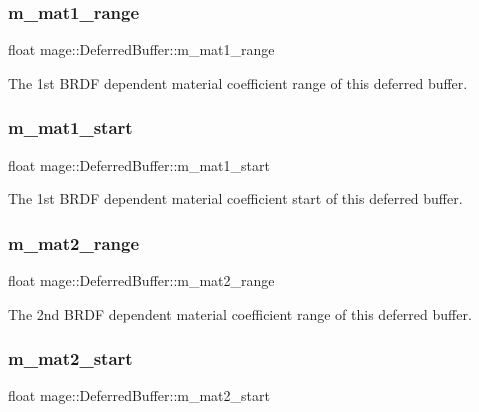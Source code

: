 \subsubsection{\texorpdfstring{m\+\_\+mat1\+\_\+range}{m\_mat1\_range}}
{\footnotesize\ttfamily float mage\+::\+Deferred\+Buffer\+::m\+\_\+mat1\+\_\+range}

The 1st B\+R\+DF dependent material coefficient range of this deferred buffer. \hypertarget{structmage_1_1_deferred_buffer_a816bdbe74ebf1f923e9b035f995c3373}{}\label{structmage_1_1_deferred_buffer_a816bdbe74ebf1f923e9b035f995c3373} 
\subsubsection{\texorpdfstring{m\+\_\+mat1\+\_\+start}{m\_mat1\_start}}
{\footnotesize\ttfamily float mage\+::\+Deferred\+Buffer\+::m\+\_\+mat1\+\_\+start}

The 1st B\+R\+DF dependent material coefficient start of this deferred buffer. \hypertarget{structmage_1_1_deferred_buffer_ac0834abb80ac742f94d207bab570fcd9}{}\label{structmage_1_1_deferred_buffer_ac0834abb80ac742f94d207bab570fcd9} 
\subsubsection{\texorpdfstring{m\+\_\+mat2\+\_\+range}{m\_mat2\_range}}
{\footnotesize\ttfamily float mage\+::\+Deferred\+Buffer\+::m\+\_\+mat2\+\_\+range}

The 2nd B\+R\+DF dependent material coefficient range of this deferred buffer. \hypertarget{structmage_1_1_deferred_buffer_a04dc925c3f765d7ca2ed747dd180c438}{}\label{structmage_1_1_deferred_buffer_a04dc925c3f765d7ca2ed747dd180c438} 
\subsubsection{\texorpdfstring{m\+\_\+mat2\+\_\+start}{m\_mat2\_start}}
{\footnotesize\ttfamily float mage\+::\+Deferred\+Buffer\+::m\+\_\+mat2\+\_\+start}

